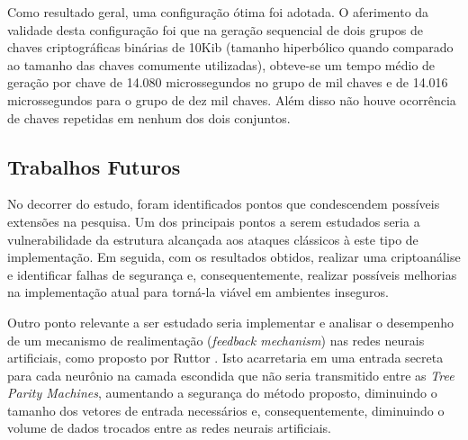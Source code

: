 \documentclass[12pt]{article}
\begin{document}
        Como resultado geral, uma configuração ótima foi adotada. O aferimento da validade desta configuração foi que na geração sequencial de dois grupos de chaves criptográficas binárias de 10Kib (tamanho hiperbólico quando comparado ao tamanho das chaves comumente utilizadas), obteve-se um tempo médio de geração por chave de 14.080 microssegundos no grupo de mil chaves e de 14.016 microssegundos para o grupo de dez mil chaves. Além disso não houve ocorrência de chaves repetidas em nenhum dos dois conjuntos.
        

        \subsection{Trabalhos Futuros}
        \label{subsec:trabalhosFuturos}
        
            No decorrer do estudo, foram identificados pontos que condescendem possíveis extensões na pesquisa. Um dos principais pontos a serem estudados seria a vulnerabilidade da estrutura alcançada aos ataques clássicos à este tipo de implementação. Em seguida, com os resultados obtidos, realizar uma criptoanálise e identificar falhas de segurança e, consequentemente, realizar possíveis melhorias na implementação atual para torná-la viável em ambientes inseguros.

            Outro ponto relevante a ser estudado seria implementar e analisar o desempenho de um mecanismo de realimentação (\textit{feedback mechanism}) nas redes neurais artificiais, como proposto por Ruttor \cite{ruttor2007neural}. Isto acarretaria em uma entrada secreta para cada neurônio na camada escondida que não seria transmitido entre as \textit{Tree Parity Machines}, aumentando a segurança do método proposto, diminuindo o tamanho dos vetores de entrada necessários e, consequentemente, diminuindo o volume de dados trocados entre as redes neurais artificiais.
  
    
    

\flushend 
\end{document}
